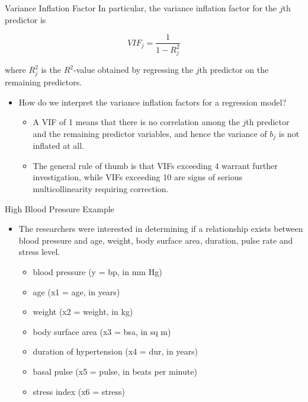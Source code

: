 \documentclass[
  ignorenonframetext,
]{beamer}
\providecommand{\tightlist}{%
  \setlength{\itemsep}{0pt}\setlength{\parskip}{0pt}}
\begin{document}
\begin{frame}{Variance Inflation Factor}
\protect\hypertarget{variance-inflation-factor-1}{}
In particular, the variance inflation factor for the \(j\)th predictor
is

\[VIF_j=\frac{1}{1-R^2_j}\]

where \(R^2_j\) is the \(R^2\)-value obtained by regressing the \(j\)th
predictor on the remaining predictors.

\begin{itemize}
\item
  How do we interpret the variance inflation factors for a regression
  model?

  \begin{itemize}
  \tightlist
  \item
    A VIF of 1 means that there is no correlation among the \(j\)th
    predictor and the remaining predictor variables, and hence the
    variance of \(b_j\) is not inflated at all.
  \item
    The general rule of thumb is that VIFs exceeding 4 warrant further
    investigation, while VIFs exceeding 10 are signs of serious
    multicollinearity requiring correction.
  \end{itemize}
\end{itemize}
\end{frame}

\begin{frame}{High Blood Pressure Example}
\protect\hypertarget{high-blood-pressure-example}{}
\begin{itemize}
\item
  The researchers were interested in determining if a relationship
  exists between blood pressure and age, weight, body surface area,
  duration, pulse rate and stress level.

  \begin{itemize}
  \tightlist
  \item
    blood pressure (y = bp, in mm Hg)
  \item
    age (x1 = age, in years)
  \item
    weight (x2 = weight, in kg)
  \item
    body surface area (x3 = bsa, in sq m)
  \item
    duration of hypertension (x4 = dur, in years)
  \item
    basal pulse (x5 = pulse, in beats per minute)
  \item
    stress index (x6 = stress)
  \end{itemize}
\end{itemize}
\end{frame}
\end{document}
